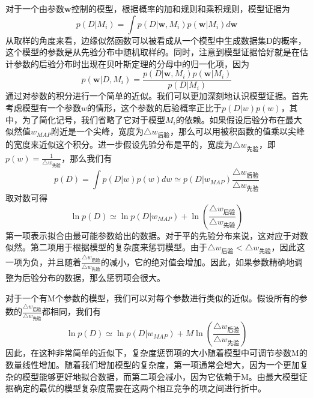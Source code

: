 对于一个由参数$\boldsymbol{w}$控制的模型，根据概率的加和规则和乘积规则，模型证据为
\begin{equation}
	p(D|M_i)=\int p(D|\boldsymbol{w},M_i)p(\boldsymbol{w}|M_i)d\boldsymbol{w}
\end{equation}
从取样的角度来看，边缘似然函数可以被看成从一个模型中生成数据集D的概率，这个模型的参数是从先验分布中随机取样的。同时，注意到模型证据恰好就是在估计参数的后验分布时出现在贝叶斯定理的分母中的归一化项，因为 
\begin{equation}
	p(\boldsymbol{w}|D,M_i)=\frac{p(D|\boldsymbol{w},M_i)p(\boldsymbol{w}|M_i)}{p(D|M_i)}
\end{equation}
通过对参数的积分进行一个简单的近似。我们可以更加深刻地认识模型证据。首先考虑模型有一个参数$w$的情形，这个参数的后验概率正比于$p(D|w)p(w)$，其中，为了简化记号，我们省略了它对于模型$M_i$的依赖。如果假设后验分布在最大似然值$w_{MAP}$附近是一个尖峰，宽度为$\triangle w_{\text{后验}}$，那么可以用被积函数的值乘以尖峰的宽度来近似这个积分。进一步假设先验分布是平的，宽度为$\triangle w_{\text{先验}}$，即$p(w)=\frac{1}{\triangle w_{\text{先验}}}$，那么我们有
\begin{equation}
	p(D)=\int p(D|w)p(w)dw\simeq p(D|w_{MAP})\frac{\triangle w_{\text{后验}}}{\triangle w_{\text{先验}}}
\end{equation}
取对数可得
\begin{equation}
	\ln p(D)\simeq \ln p(D|w_{MAP})+\ln \left(\frac{\triangle w_{\text{后验}}}{\triangle w_{\text{先验}}} \right)
\end{equation}
第一项表示拟合由最可能参数给出的数据。对于平的先验分布来说，这对应于对数似然。第二项用于根据模型的复杂度来惩罚模型。由于$\triangle w_{\text{后验}}<\triangle w_{\text{先验}}$，因此这一项为负，并且随着$\frac{\triangle w_{\text{后验}}}{\triangle w_{\text{先验}}}$的减小，它的绝对值会增加。因此，如果参数精确地调整为后验分布的数据，那么惩罚项会很大。

对于一个有M个参数的模型，我们可以对每个参数进行类似的近似。假设所有的参数的$\frac{\triangle w_{\text{后验}}}{\triangle w_{\text{先验}}}$都相同，我们有
\begin{equation}
\ln p(D)\simeq \ln p(D|w_{MAP})+M\ln \left(\frac{\triangle w_{\text{后验}}}{\triangle w_{\text{先验}}} \right)
\end{equation}
因此，在这种非常简单的近似下，复杂度惩罚项的大小随着模型中可调节参数M的数量线性增加。随着我们增加模型的复杂度，第一项通常会增大，因为一个更加复杂的模型能够更好地拟合数据，而第二项会减小，因为它依赖于M。由最大模型证据确定的最优的模型复杂度需要在这两个相互竞争的项之间进行折中。

